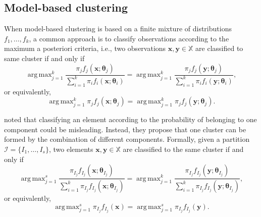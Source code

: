 \documentclass[10pt, a4paper]{article}
\DeclareMathOperator*{\argmax}{arg\,max}
\newcommand{\m}[1]{\boldsymbol{#1}}
\begin{document}
\subsection*{Model-based clustering}

When model-based clustering is based on a finite mixture of distributions $f_1, \dots, f_k$, a common approach is to classify observations according to the maximum a posteriori criteria, i.e., two observations $\m x, \m y \in \mathbb{X}$ are classified to same cluster if and only if
\[
\argmax_{j=1}^k \frac{ \pi_j f_j(\m x ; \m\theta_j) }{\sum_{i=1}^k \pi_i f_i(\m x ; \m\theta_i) } = \argmax_{j=1}^k \frac{ \pi_j f_j(\m y ; \m\theta_j) }{ \sum_{i=1}^k \pi_i f_i(\m y ; \m\theta_i) },
\]
or equivalently,
\[
\argmax_{j=1}^k \pi_j f_j(\m x ; \m\theta_j) = \argmax_{j=1}^k \pi_j f_j(\m y ; \m\theta_j).
\]



\cite{lee2004combining,hennig2010methods,baudry2010combining,melnykov2013distribution,pastore2013merging} noted that classifying an element according to the probability of belonging to one component could be misleading. Instead, they propose that one cluster can be formed by the combination of different components. Formally, given a partition $\mathcal{I} = \{ I_1, \dots, I_s\}$, two elements $\m x, \m y \in \mathbb{X}$ are classified to the same cluster if and only if
\[
\argmax_{j=1}^s \frac{ \pi_{I_j} f_{I_j}(\m x ; \m\theta_{I_j}) }{\sum_{i=1}^k \pi_{I_j} f_{I_j}(\m x ; \m\theta_{I_j}) } = \argmax_{j=1}^k \frac{ \pi_{I_j} f_{I_j}(\m y ; \m\theta_{I_j}) }{ \sum_{i=1}^k \pi_{I_j} f_{I_j}(\m y ; \m\theta_{I_j}) },
\]
or equivalently,
\[
\argmax_{j=1}^s \pi_{I_j} f_{I_j}(\m x) = \argmax_{j=1}^s \pi_{I_j} f_{I_j}(\m y).
\]
\end{document}
